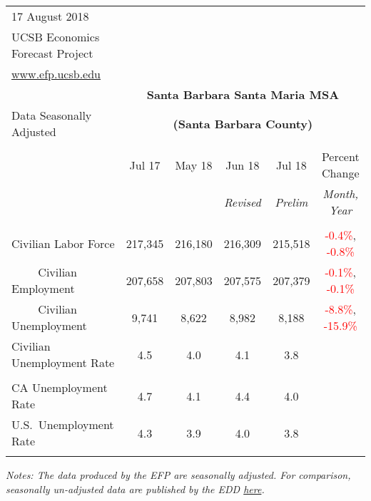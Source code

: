 \documentclass[12pt]{article}
\begin{document}
\begin{table}
\begin{tabular}{|l|c|c|c|c|c|}
\multicolumn{1}{l}{\small 17 August 2018} & \multicolumn{5}{c}{} \\
\multicolumn{1}{l}{\small UCSB Economics Forecast Project} & \multicolumn{5}{c}{} \\
\multicolumn{1}{l}{\small \href{http://www.efp.ucsb.edu/}{www.efp.ucsb.edu}} & \multicolumn{5}{c}{} \\
\multicolumn{1}{c}{} & \multicolumn{5}{c}{\large \textbf{Santa Barbara Santa Maria MSA}} \\
\multicolumn{1}{l}{\small Data Seasonally Adjusted} & \multicolumn{5}{c}{\small \textbf{(Santa Barbara County)}} \\ \hline \hline
& & & & & \\
 & Jul 17 & May 18 & Jun 18 & Jul 18 & Percent Change \\
 & & & \small \textit{Revised} & \small \textit{Prelim} & \small \textit{Month, Year} \\ \hline
& & & & & \\
Civilian Labor Force & 217,345 & 216,180 & 216,309 & 215,518 & \textcolor{red}{-0.4\%}, \textcolor{red}{-0.8\%} \\
$\qquad$ \small Civilian Employment & 207,658 & 207,803 & 207,575 & 207,379 & \textcolor{red}{-0.1\%}, \textcolor{red}{-0.1\%} \\
$\qquad$ \small Civilian Unemployment & 9,741 & 8,622 & 8,982 & 8,188 & \textcolor{red}{-8.8\%}, \textcolor{red}{-15.9\%} \\
Civilian Unemployment Rate & 4.5 & 4.0 & 4.1 & 3.8 & \\
& & & & & \\
CA Unemployment Rate & 4.7 & 4.1 & 4.4 & 4.0 & \\
U.S.\ Unemployment Rate & 4.3 & 3.9 & 4.0 & 3.8 & \\
& & & & & \\ \hline \hline
\end{tabular}
\par
\vspace{.5em}
\footnotesize
\textit{Notes: The data produced by the EFP are seasonally adjusted. For comparison, seasonally un-adjusted data are published by the EDD \href{http://www.labormarketinfo.ca.gov/file/lfmonth/satb$pds.pdf}{here}.}
\end{table}
\end{document}
